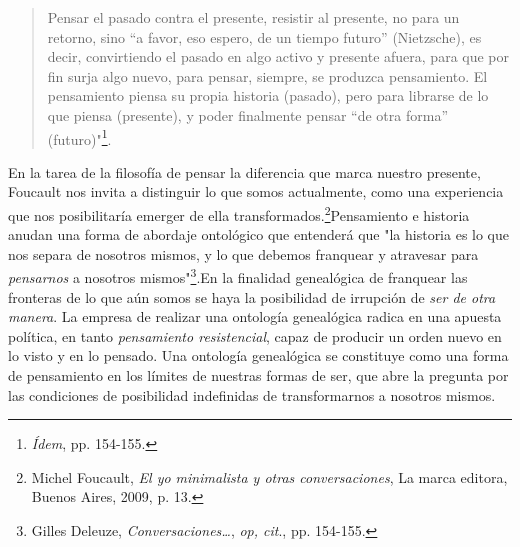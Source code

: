 \documentclass{book}
\begin{document}
\begin{quote}
Pensar el pasado contra el presente, resistir al presente, no para un
retorno, sino ``a favor, eso espero, de un tiempo futuro'' (Nietzsche),
es decir, convirtiendo el pasado en algo activo y presente afuera, para
que por fin surja algo nuevo, para pensar, siempre, se produzca
pensamiento. El pensamiento piensa su propia historia (pasado), pero
para librarse de lo que piensa (presente), y poder finalmente pensar
``de otra forma'' (futuro)"\footnote{\emph{Ídem}, pp. 154-155.}.
\end{quote}

En la tarea de la filosofía de pensar la diferencia que marca nuestro
presente, Foucault nos invita a distinguir lo que somos actualmente,
como una experiencia que nos posibilitaría emerger de ella
transformados.\footnote{Michel Foucault, \emph{El yo minimalista y otras
  conversaciones}, La marca editora, Buenos Aires, 2009, p. 13.}Pensamiento
e historia anudan una forma de abordaje ontológico que entenderá que "la
historia es lo que nos separa de nosotros mismos, y lo que debemos
franquear y atravesar para \emph{pensarnos} a nosotros
mismos"\footnote{Gilles Deleuze, \emph{Conversaciones\ldots{}},
  \emph{op, cit}., pp. 154-155.}.En la finalidad genealógica de
franquear las fronteras de lo que aún somos se haya la posibilidad de
irrupción de \emph{ser de otra manera}. La empresa de realizar una
ontología genealógica radica en una apuesta política, en tanto
\emph{pensamiento resistencial}, capaz de producir un orden nuevo en lo
visto y en lo pensado. Una ontología genealógica se constituye como una
forma de pensamiento en los límites de nuestras formas de ser, que abre
la pregunta por las condiciones de posibilidad indefinidas de
transformarnos a nosotros mismos.
\end{document}
